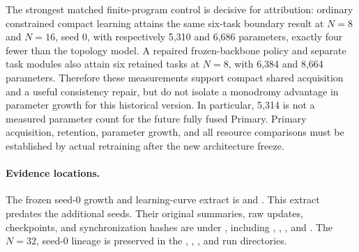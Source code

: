 The strongest matched finite-program control is decisive for attribution:
ordinary constrained compact learning attains the same six-task boundary
result at $N=8$ and $N=16$, seed 0, with respectively 5,310 and 6,686 parameters,
exactly four fewer than the topology model. A repaired frozen-backbone policy
and separate task modules also attain six retained tasks at $N=8$, with 6,384
and 8,664 parameters. Therefore these measurements support compact shared
acquisition and a useful consistency repair, but do not isolate a monodromy
advantage in parameter growth for this historical version. In particular,
5,314 is not a measured parameter count for the future fully fused Primary.
Primary acquisition, retention, parameter growth, and all resource comparisons
must be established by actual retraining after the new architecture freeze.

\paragraph{Evidence locations.}
The frozen seed-0 growth and learning-curve extract is
and
.
This extract predates the additional seeds. Their original summaries, raw
updates, checkpoints, and synchronization hashes are under
,
including ,
,
, and
.
The $N=32$, seed-0 lineage is preserved in the
,
,
, and
 run directories.
